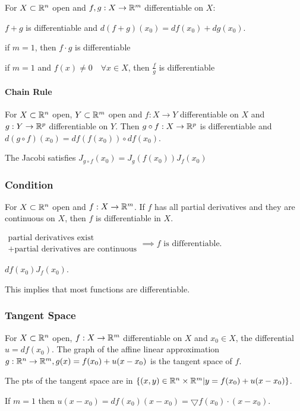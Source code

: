 For $X \subset \mathbb{R}^n$ open and $f, g: X \to \mathbb{R}^m$ differentiable on $X$:
\begin{compactitem}
    \item $f + g$ is differentiable and $d(f + g)(x_0) = df(x_0) + dg(x_0)$.
    \item if $m = 1$, then $f \cdot g$ is differentiable
    \item if $m = 1$ and $f(x) \neq 0 \quad \forall x \in X$, then $\frac{f}{g}$ is differentiable
\end{compactitem}

\paragraph{Chain Rule}
For $X \subset \mathbb{R}^n$ open, $Y \subset \mathbb{R}^m$ open and $f: X \to Y$ differentiable on $X$ and $g: Y \to \mathbb{R}^p$ differentiable on $Y$. Then $g \circ f: X \to \mathbb{R}^p$ is differentiable and $d(g \circ f)(x_0) = df(f(x_0)) \circ df(x_0)$.

\begin{compactitem}
    \item The Jacobi satisfies $J_{g \circ f}(x_0) = J_g(f(x_0))J_f(x_0)$
\end{compactitem}

\subsubsection{Condition}
For $X \subset \mathbb{R}^n$ open and $f: X \to \mathbb{R}^m$. If $f$ has all partial derivatives and they are continuous on $X$, then $f$ is differentiable in $X$.

\begin{compactitem}
    \item $\substack{\text{partial derivatives exist}\\ + \text{partial derivatives are continuous}} \implies f \text{ is differentiable}$.
    \item $df(x_0) J_f(x_0)$.
    \item This implies that most functions are differentiable.
\end{compactitem}

\subsubsection{Tangent Space}
For $X \subset \mathbb{R}^n$ open, $f: X \to \mathbb{R}^m$ differentiable on $X$ and $x_0 \in X$, the differential $u = df(x_0)$. The graph of the affine linear approximation $g: \mathbb{R}^n \to \mathbb{R}^m, g(x) = f(x_0) + u(x - x_0)$ is the tangent space of $f$.  
\begin{compactitem}
    \item The pts of the tangent space are in $\{(x, y) \in \mathbb{R}^n \times \mathbb{R}^m | y = f(x_0) + u(x - x_0) \}$.
    \item If $m = 1$ then $u(x - x_0) = df(x_0)(x - x_0) = \bigtriangledown f(x_0) \cdot (x - x_0)$.
\end{compactitem}

